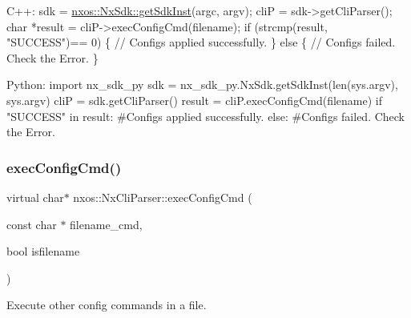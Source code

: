\begin{DoxyCode}
C++:
     sdk = \mbox{\hyperlink{classnxos_1_1_nx_sdk_a5050e2d26c40744b4fc7862068a83f39}{nxos::NxSdk::getSdkInst}}(argc, argv);
     cliP = sdk->getCliParser();
     \textcolor{keywordtype}{char} *result = cliP->execConfigCmd(filename);
     \textcolor{keywordflow}{if} (strcmp(result, \textcolor{stringliteral}{"SUCCESS"})== 0) \{
         \textcolor{comment}{// Configs applied successfully.}
     \} \textcolor{keywordflow}{else} \{
         \textcolor{comment}{// Configs failed. Check the Error.}
     \}

Python:
     \textcolor{keyword}{import} nx\_sdk\_py
     sdk = nx\_sdk\_py.NxSdk.getSdkInst(len(sys.argv), sys.argv)
     cliP = sdk.getCliParser()
     result = cliP.execConfigCmd(filename)
     \textcolor{keywordflow}{if} \textcolor{stringliteral}{"SUCCESS"} in result:
\textcolor{preprocessor}{         #Configs applied successfully.}
     \textcolor{keywordflow}{else}:
\textcolor{preprocessor}{         #Configs failed. Check the Error.}
\end{DoxyCode}
 \mbox{\label{classnxos_1_1_nx_cli_parser_a82767646d23e67dd7e62740587a368ea}} 
\subsubsection{\texorpdfstring{exec\+Config\+Cmd()}{execConfigCmd()}\hspace{0.1cm}{\footnotesize\ttfamily [2/2]}}
{\footnotesize\ttfamily virtual char$\ast$ nxos\+::\+Nx\+Cli\+Parser\+::exec\+Config\+Cmd (\begin{DoxyParamCaption}\item[{const char $\ast$}]{filename\+\_\+cmd,  }\item[{bool}]{isfilename }\end{DoxyParamCaption})\hspace{0.3cm}{\ttfamily [pure virtual]}}

Execute other config commands in a file.


